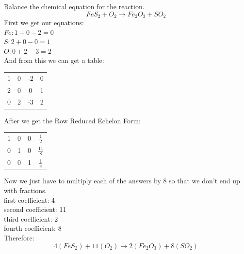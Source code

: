 \documentclass{article}
\begin{document}
Balance the chemical equation for the reaction.
\[ FeS_2 +  O_2 \rightarrow Fe_2O_3 + SO_2 \]
First we get our equations: \\
$Fe: 1 + 0 - 2 = 0$ \\
$S: 2 + 0 - 0 = 1$ \\
$ O: 0 + 2 - 3 = 2$ \\
And from this we can get a table:
\begin{center}
\begin{tabular}{ c c c | c }
	1 & 0 & -2 & 0 \\
	2 & 0 & 0 & 1 \\
	0 & 2 & -3 & 2 \\
\end{tabular}
\end{center}
After we get the Row Reduced Echelon Form:
\begin{center}
\begin{tabular}{ c c c | c }
	1 & 0 & 0 & $\frac{1}{2}$ \\
	0 & 1 & 0 & $\frac{11}{8}$ \\
	0 & 0 & 1 & $\frac{1}{4}$ \\
\end{tabular}
\end{center}
Now we just have to multiply each of the answers by 8 so that we don't end up with fractions. \\
first coefficient: 4 \\
second coefficient: 11 \\
third coefficient: 2 \\
fourth coefficient: 8 \\

Therefore:
\[ 4(FeS_2) +  11(O_2) \rightarrow 2(Fe_2O_3) + 8(SO_2) \]
\end{document}
